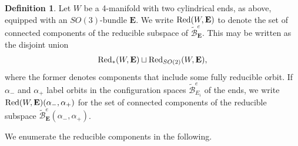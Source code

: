 \documentclass[10pt,a4paper]{amsart}
\theoremstyle{definition}
\newtheorem{definition}[theorem]{Definition}
\theoremstyle{remark}
\numberwithin{figure}{qchap}
\begin{document}
\begin{definition}\label{red-def-W}Let $W$ be a 4-manifold with two cylindrical ends, as above, equipped with an $SO(3)$-bundle $\mathbf{E}$. We write $\textup{Red}(W,\mathbf{E})$ to denote the set of connected components of the reducible subspace of $\widetilde{\mathcal B}^e_{\mathbf{E}}$. This may be written as the disjoint union $$\textup{Red}_*(W,\mathbf{E}) \sqcup \textup{Red}_{SO(2)}(W,\mathbf{E}),$$ where the former denotes components that include some fully reducible orbit. If $\alpha_-$ and $\alpha_+$ label orbits in the configuration spaces $\widetilde{\mathcal B}^e_{E_i}$ of the ends, we write $\textup{Red}(W,\mathbf{E})(\alpha_-, \alpha_+)$ for the set of connected components of the reducible subspace $\widetilde{\mathcal B}^{e}_{\mathbf{E}}(\alpha_-, \alpha_+)$.
\end{definition}

We enumerate the reducible components in the following.
\end{document}
